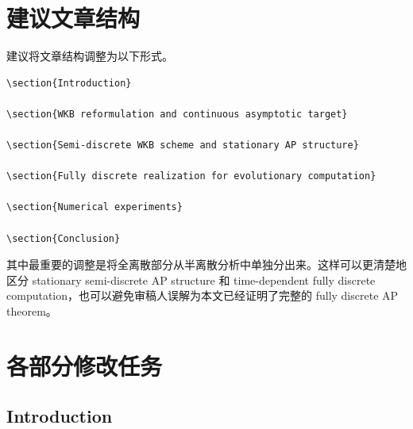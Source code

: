 \documentclass[11pt,a4paper]{ctexart}
\begin{document}
\section{建议文章结构}

建议将文章结构调整为以下形式。
\begin{verbatim}
\section{Introduction}

\section{WKB reformulation and continuous asymptotic target}

\section{Semi-discrete WKB scheme and stationary AP structure}

\section{Fully discrete realization for evolutionary computation}

\section{Numerical experiments}

\section{Conclusion}
\end{verbatim}

其中最重要的调整是将全离散部分从半离散分析中单独分出来。这样可以更清楚地区分 stationary semi-discrete AP structure 和 time-dependent fully discrete computation，也可以避免审稿人误解为本文已经证明了完整的 fully discrete AP theorem。

\section{各部分修改任务}

\subsection{Introduction}
\end{document}
